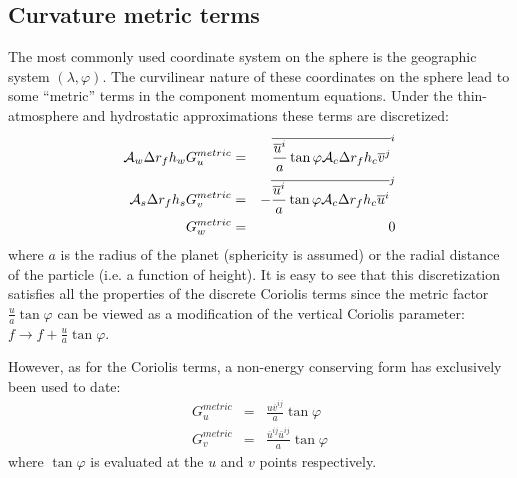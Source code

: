 

\subsection{Curvature metric terms}

The most commonly used coordinate system on the sphere is the
geographic system $(\lambda,\varphi)$. The curvilinear nature of these
coordinates on the sphere lead to some ``metric'' terms in the
component momentum equations. Under the thin-atmosphere and
hydrostatic approximations these terms are discretized:
\begin{eqnarray}
{\cal A}_w \Delta r_f h_w G_u^{metric} & = &
  \overline{ \frac{ \overline{u}^i }{a} \tan{\varphi} {\cal A}_c \Delta r_f h_c \overline{ v }^j }^i \\
{\cal A}_s \Delta r_f h_s G_v^{metric} & = &
- \overline{ \frac{ \overline{u}^i }{a} \tan{\varphi} {\cal A}_c \Delta r_f h_c \overline{ u }^i }^j \\
G_w^{metric} & = & 0
\end{eqnarray}
where $a$ is the radius of the planet (sphericity is assumed) or the
radial distance of the particle (i.e. a function of height).  It is
easy to see that this discretization satisfies all the properties of
the discrete Coriolis terms since the metric factor $\frac{u}{a}
\tan{\varphi}$ can be viewed as a modification of the vertical Coriolis
parameter: $f \rightarrow f+\frac{u}{a} \tan{\varphi}$.

However, as for the Coriolis terms, a non-energy conserving form has
exclusively been used to date:
\begin{eqnarray}
G_u^{metric} & = & \frac{u \overline{v}^{ij} }{a} \tan{\varphi} \\
G_v^{metric} & = & \frac{ \overline{u}^{ij} \overline{u}^{ij}}{a} \tan{\varphi}
\end{eqnarray}
where $\tan{\varphi}$ is evaluated at the $u$ and $v$ points
respectively.




